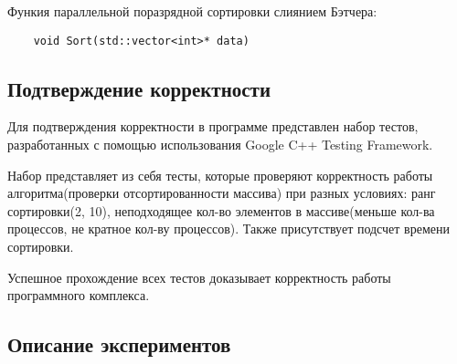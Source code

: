 \documentclass{report}
\begin{document}
Функия параллельной поразрядной сортировки слиянием Бэтчера:
\begin{lstlisting}
	void Sort(std::vector<int>* data)
\end{lstlisting}
\newpage

\begin{center}
\section*{Подтверждение корректности}
\end{center}

Для подтверждения корректности в программе представлен набор тестов, разработанных с помощью использования Google C++ Testing Framework.
\par Набор представляет из себя тесты, которые проверяют корректность работы алгоритма(проверки отсортированности массива) при разных условиях: ранг сортировки(2, 10), неподходящее кол-во элементов в массиве(меньше кол-ва процессов, не кратное кол-ву процессов). Также присутствует подсчет времени сортировки.
\par Успешное прохождение всех тестов доказывает корректность работы программного комплекса.
\newpage

\begin{center}
\section*{Описание экспериментов}
\end{center}
\end{document}

